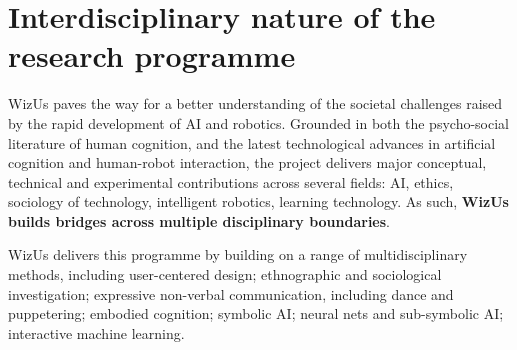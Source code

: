 \documentclass[11pt,a4paper]{report}
\newcommand{\project}{WizUs\xspace}
\begin{document}
%
%
%
%
%

\section{Interdisciplinary nature of the research programme}

\project paves the way for a better understanding of the societal challenges
raised by the rapid development of AI and robotics. Grounded in both the
psycho-social literature of human cognition, and the latest technological
advances in artificial cognition and human-robot interaction, the project
delivers major conceptual, technical and experimental contributions across
several fields: AI, ethics, sociology of technology, intelligent robotics,
learning technology. As such, \textbf{\project builds bridges across
multiple disciplinary boundaries}.

\project delivers this programme by building on a range of multidisciplinary
methods, including user-centered design; ethnographic and sociological
investigation; expressive non-verbal communication, including dance and
puppetering; embodied cognition; symbolic AI; neural
nets and sub-symbolic AI; interactive machine learning.
\end{document}
